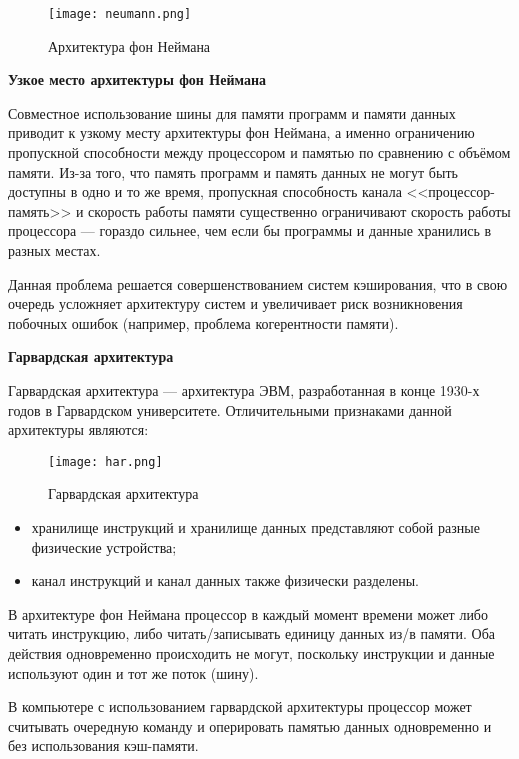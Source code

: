 \documentclass[12pt]{article}
\begin{document}
\begin{figure}
\centering
\texttt{[image: neumann.png]}
\caption{Архитектура фон Неймана}
\label{fig:mpr}
\end{figure}

\textbf{Узкое место архитектуры фон Неймана}

Совместное использование шины для памяти программ и памяти данных приводит к узкому месту архитектуры фон Неймана, а именно ограничению пропускной способности между процессором и памятью по сравнению с объёмом памяти. Из-за того, что память программ и память данных не могут быть доступны в одно и то же время, пропускная способность канала <<процессор-память>> и скорость работы памяти существенно ограничивают скорость работы процессора — гораздо сильнее, чем если бы программы и данные хранились в разных местах.

Данная проблема решается совершенствованием систем кэширования, что в свою очередь усложняет архитектуру систем и увеличивает риск возникновения побочных ошибок (например, проблема когерентности памяти).


\textbf{Гарвардская архитектура}

Гарвардская архитектура --- архитектура ЭВМ, разработанная в конце 1930-х годов в Гарвардском университете. Отличительными признаками данной архитектуры являются:

\begin{figure}
\centering
\texttt{[image: har.png]}
\caption{Гарвардская архитектура}
\label{fig:mpr}
\end{figure}

\begin{itemize}

\item  хранилище инструкций и хранилище данных представляют собой разные физические устройства;

\item канал инструкций и канал данных также физически разделены.
\end{itemize}

В архитектуре фон Неймана процессор в каждый момент времени может либо читать инструкцию, либо читать/записывать единицу данных из/в памяти. Оба действия одновременно происходить не могут, поскольку инструкции и данные используют один и тот же поток (шину).

В компьютере с использованием гарвардской архитектуры процессор может считывать очередную команду и оперировать памятью данных одновременно и без использования кэш-памяти.
\end{document}
